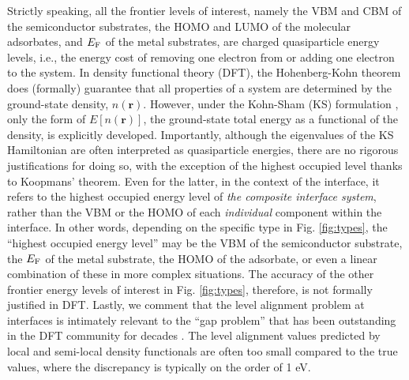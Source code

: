 \documentclass[aip, amsmath, amssymb, reprint, longbibliography]{revtex4-2}
\begin{document}
Strictly speaking, all the frontier levels of interest, namely the VBM and CBM of the semiconductor substrates, the HOMO and LUMO of the molecular adsorbates, and $E_{\rm F}$ of the metal substrates, are charged quasiparticle energy levels, i.e., the energy cost of removing one electron from or adding one electron to the system. In density functional theory (DFT), the Hohenberg-Kohn theorem \cite{HK64} does (formally) guarantee that all properties of a system are determined by the ground-state density, $n(\mathbf{r})$. However, under the Kohn-Sham (KS) formulation \cite{KS65}, only the form of $E[n(\mathbf{r})]$, the ground-state total energy as a functional of the density, is explicitly developed. Importantly, although the eigenvalues of the KS Hamiltonian are often interpreted as quasiparticle energies, there are no rigorous justifications for doing so, with the exception of the highest occupied level thanks to Koopmans' theorem. Even for the latter, in the context of the interface, it refers to the highest occupied energy level of \emph{the composite interface system}, rather than the VBM or the HOMO of each \emph{individual} component within the interface. In other words, depending on the specific type in Fig. \ref{fig:types}, the ``highest occupied energy level'' may be the VBM of the semiconductor substrate, the $E_{\rm F}$ of the metal substrate, the HOMO of the adsorbate, or even a linear combination of these in more complex situations. The accuracy of the other frontier energy levels of interest in Fig. \ref{fig:types}, therefore, is not formally justified in DFT. Lastly, we comment that the level alignment problem at interfaces is intimately relevant to the ``gap problem'' that has been outstanding in the DFT community for decades \cite{PPLB82}. The level alignment values predicted by local and semi-local density functionals are often too small compared to the true values, where the discrepancy is typically on the order of 1 eV.
\end{document}
